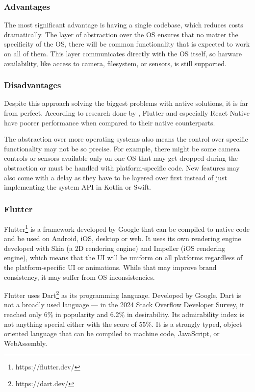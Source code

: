 \documentclass[
  digital,     %
  color,       %
  oneside,     %
  nosansbold,  %
  nocolorbold, %
  lof,         %
  lot,         %
]{fithesis4}
\begin{document}
\subsubsection{Advantages}
The most significant advantage is having a single codebase, which reduces costs dramatically. The layer of abstraction over the OS ensures that no matter the specificity of the OS, there will be common functionality that is expected to work on all of them. This layer communicates directly with the OS itself, so harware availability, like access to camera, filesystem, or sensors, is still supported.
\subsubsection{Disadvantages}
Despite this approach solving the biggest problems with native solutions, it is far from perfect. According to research done by \cite{NativeVsMultiplatform}, Flutter and especially React Native have poorer performance when compared to their native counterparts. 

The abstraction over more operating systems also means the control over specific functionality may not be so precise. For example, there might be some camera controls or sensors available only on one OS that may get dropped during the abstraction or must be handled with platform-specific code. New features may also come with a delay as they have to be layered over first instead of just implementing the system API in Kotlin or Swift. 
\subsubsection{Flutter}
Flutter\footnote{https://flutter.dev/} is a framework developed by Google that can be compiled to native code and be used on Android, iOS, desktop or web\cite{FlutterFAQ}. It uses its own rendering engine developed with Skia (a 2D rendering engine) and Impeller (iOS rendering engine), which means that the UI will be uniform on all platforms regardless of the platform-specific UI or animations. While that may improve brand consistency, it may suffer from OS inconsistencies. 

Flutter uses Dart\footnote{https://dart.dev/} as its programming language. Developed by Google, Dart is not a broadly used language --- in the 2024 Stack Overflow Developer Survey\cite{StackOverflow2024}, it reached only 6\% in popularity and 6.2\% in desirability. Its admirability index is not anything special either with the score of 55\%. It is a strongly typed, object oriented language that can be compiled to machine code, JavaScript, or WebAssembly.
\end{document}
